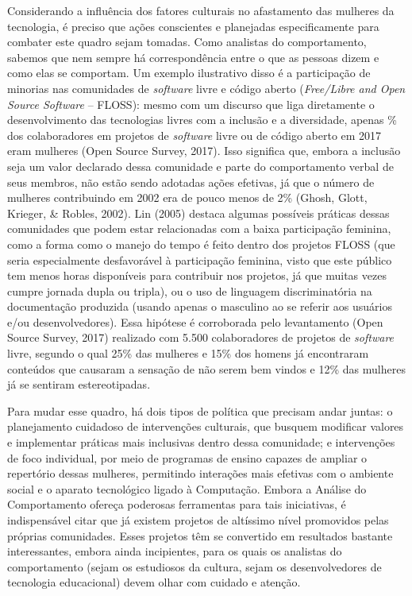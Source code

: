 Considerando a influência dos fatores culturais no afastamento das mulheres da tecnologia, é preciso que ações conscientes e planejadas especificamente para combater este quadro sejam tomadas. Como analistas do comportamento, sabemos que nem sempre há correspondência entre o que as pessoas dizem e como elas se comportam. Um exemplo ilustrativo disso é a participação de minorias nas comunidades de \textit{software} livre e código aberto (\textit{Free/Libre and Open Source Software} – FLOSS): mesmo com um discurso que liga diretamente o desenvolvimento das tecnologias livres com a inclusão e a diversidade, apenas \% dos colaboradores em projetos de \textit{software} livre ou de código aberto em 2017 eram mulheres (Open Source Survey, 2017). Isso significa que, embora a inclusão seja um valor declarado dessa comunidade e parte do comportamento verbal de seus membros, não estão sendo adotadas ações efetivas, já que o número de mulheres contribuindo em 2002 era de pouco menos de 2\% (Ghosh, Glott, Krieger, \& Robles, 2002). Lin (2005) destaca algumas possíveis práticas dessas comunidades que podem estar relacionadas com a baixa participação feminina, como a forma como o manejo do tempo é feito dentro dos projetos FLOSS (que seria especialmente desfavorável à participação feminina, visto que este público tem menos horas disponíveis para contribuir nos projetos, já que muitas vezes cumpre jornada dupla ou tripla), ou o uso de linguagem discriminatória na documentação produzida (usando apenas o masculino ao se referir aos usuários e/ou desenvolvedores). Essa hipótese é corroborada pelo levantamento (Open Source Survey, 2017) realizado com 5.500 colaboradores de projetos de \textit{software} livre, segundo o qual 25\% das mulheres e 15\% dos homens já encontraram conteúdos que causaram a sensação de não serem bem vindos e 12\% das mulheres já se sentiram estereotipadas. 

Para mudar esse quadro, há dois tipos de política que precisam andar juntas: o planejamento cuidadoso de intervenções culturais, que busquem modificar valores e implementar práticas mais inclusivas dentro dessa comunidade; e intervenções de foco individual, por meio de programas de ensino capazes de ampliar o repertório dessas mulheres, permitindo interações mais efetivas com o ambiente social e o aparato tecnológico ligado à Computação. Embora a Análise do Comportamento ofereça poderosas ferramentas para tais iniciativas, é indispensável citar que já existem projetos de altíssimo nível promovidos pelas próprias comunidades. Esses projetos têm se convertido em resultados bastante interessantes, embora ainda incipientes, para os quais os analistas do comportamento (sejam os estudiosos da cultura, sejam os desenvolvedores de tecnologia educacional) devem olhar com cuidado e atenção.

